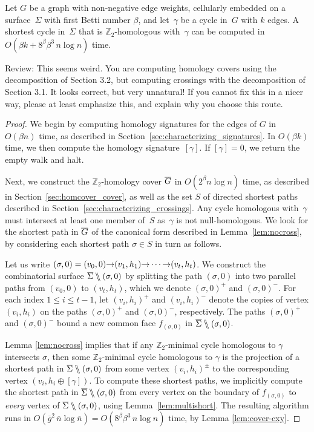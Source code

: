 \documentclass[letterpaper,review]{siamart190516}
\def\arcto{\mathord\shortrightarrow}
\def\Z{\mathbb{Z}}
\def\snip{\mathbin{\raisebox{0.15ex}{\rotatebox[origin=c]{60}{\Rightscissors}\!}}}
\def\snip{\mathbin{\backslash\!\!\backslash}}
\def\cycle{\gamma}
\def\Sigmabar{\overline{\smash{\Sigma}\vphantom{t}}}
\def\Gbar{\overline{\smash{G}\vphantom{t}}}
\def\nbar{\overline{n}}
\def\gbar{\overline{g}}
\def\rnote#1{\color{red}Review: #1 \color{black}}
\begin{document}
{\begin{theorem}
\label{thm:min-cycle}
Let $G$ be a  graph with non-negative edge weights, cellularly embedded on a surface~$\Sigma$ with first Betti number $\beta$, and let~$\cycle$ be a cycle in~$G$ with $k$ edges.  A shortest cycle in~$\Sigma$ that is $\Z_2$-homologous with~$\cycle$ can be computed in $O(\beta k + 8^\beta \beta^3\, n\log n)$ time.
\end{theorem}
\rnote{
This seems weird. You are computing homology covers using the decomposition of Section 3.2, but computing crossings with the decomposition of Section 3.1. It looks correct, but very unnatural! If you cannot fix this in a nicer way, please at least emphasize this, and explain why you choose this route. 
}
\begin{proof}
We begin by computing homology signatures for the edges of $G$ in $O(\beta n)$ time, as described in Section~\ref{sec:characterizing_signatures}.  In $O(\beta k)$ time, we then compute the homology signature~$[\cycle]$.  If $[\cycle] = 0$, we return the empty walk and halt.

Next, we construct the $\Z_2$-homology cover $\Gbar$ in $O(2^\beta n\log n)$ time, as described in Section~\ref{sec:homcover_cover}, as well as the set $S$ of directed shortest paths described in Section~\ref{sec:characterizing_crossings}.
Any cycle homologous with~$\cycle$ must intersect at least one member of~$S$ as~$\cycle$ is not null-homologous.
We look for the shortest path in $\Gbar$ of the canonical form described in Lemma~\ref{lem:nocross}, by considering each shortest path $\sigma\in S$ in turn as follows.

Let us write $(\sigma,0) = (v_0,0) \arcto (v_1,h_1) \arcto\allowbreak \cdots\arcto (v_t, h_t)$.  We construct the combinatorial surface $\Sigmabar\snip(\sigma,0)$ by splitting the path $(\sigma,0)$ into two parallel paths from $(v_0,0)$ to $(v_t,h_t)$, which we denote  $(\sigma,0)^+$ and $(\sigma,0)^-$.  For each index $1\le i\le t-1$, let $(v_i,h_i)^+$ and $(v_i,h_i)^-$ denote the copies of vertex $(v_i,h_i)$  on the paths $(\sigma,0)^+$ and $(\sigma,0)^-$, respectively.  The paths $(\sigma,0)^+$ and $(\sigma,0)^-$ bound a new common face $f_{(\sigma,0)}$ in $\Sigmabar\snip(\sigma,0)$.

Lemma \ref{lem:nocross} implies that if any $\Z_2$-minimal cycle homologous to $\cycle$ intersects $\sigma$, then some $\Z_2$-minimal cycle homologous to $\cycle$ is the projection of a shortest path in $\Sigmabar\snip(\sigma,0)$ from some vertex $(v_i,h_i)^\pm$ to the corresponding vertex $(v_i, h_i\oplus[\cycle])$.  To compute these shortest paths, we implicitly compute the shortest path in $\Sigmabar\snip(\sigma,0)$ from every vertex on the boundary of $f_{(\sigma,0)}$ to \emph{every} vertex of $\Sigmabar\snip(\sigma,0)$, using Lemma~\ref{lem:multishort}.
The resulting algorithm runs in $O(\gbar^2\,\nbar \log \nbar) = O(8^\beta \beta^3\, n\log n)$ time, by Lemma \ref{lem:cover-cxy}.
\end{proof}

}
\end{document}
